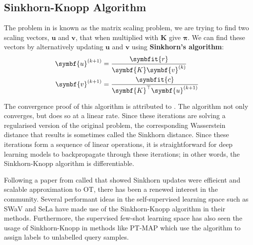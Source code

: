 \subsection{Sinkhorn-Knopp Algorithm}\label{ssec:ot-sk}
The problem in  is known as the matrix scaling problem, we are trying to find two scaling vectors, $\symbf{u}$ and $\symbf{v}$, that when multiplied with $\symbf{K}$ give $\symbf{\pi}$. We can find these vectors by alternatively updating $\symbf{u}$ and $\symbf{v}$ using \textbf{Sinkhorn's algorithm}:
\begin{align}
\symbf{u}^{(k+1)} &= \frac{\symbfit{r}}{\symbf{K}\symbf{v}^{(k)}}\\
\symbf{v}^{(k+1)} &= \frac{\symbfit{c}}{\symbf{K}^{\top}\symbf{u}^{(k+1)}}
\end{align}

The convergence proof of this algorithm is attributed to \textcite{Sinkhorn1967}. The algorithm not only converges, but does so at a linear rate. Since these iterations are solving a regularised version of the original problem, the corresponding Wasserstein distance that results is sometimes called the Sinkhorn distance. Since these iterations form a sequence of linear operations, it is straightforward for deep learning models to backpropagate through these iterations; in other words, the Sinkhorn-Knopp algorithm is differentiable.

Following a paper from \textcite{cuturi2013sinkhorn} called  that showed Sinkhorn updates were effieicnt and scalable approximation to OT, there has been a renewed interest in the community.
Several performant ideas in the self-supervised learning space such as SWaV \parencite{caron2020unsupervised} and SeLa \parencite{asano2019self} have made use of the Sinkhorn-Knopp algorithm in their methods. Furthermore, the supervised few-shot learning space has also seen the usage of Sinkhorn-Knopp in methods like PT-MAP \parencite{hu2021leveraging} which use the algorithm to assign labels to unlabelled query samples.


